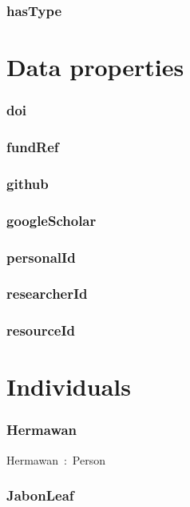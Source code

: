 \documentclass{article}
\begin{document}
\subsubsection*{hasType}

\section*{Data properties}\subsubsection*{doi}

\subsubsection*{fundRef}

\subsubsection*{github}

\subsubsection*{googleScholar}

\subsubsection*{personalId}

\subsubsection*{researcherId}

\subsubsection*{resourceId}

\section*{Individuals}\subsubsection*{Hermawan}

Hermawan~:~Person

\subsubsection*{JabonLeaf}
\end{document}
